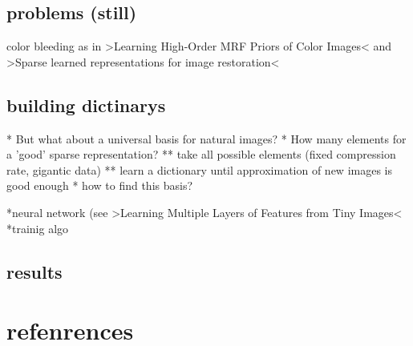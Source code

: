 \subsection{problems (still)}
\begin{frame}
color bleeding as in >Learning High-Order MRF Priors of Color Images< and >Sparse learned representations for image restoration<
\end{frame}

\subsection{building dictinarys}
\begin{frame}
* But what about a universal basis for natural images? 
* How many elements for a 'good' sparse representation?
** take all possible elements (fixed compression rate, gigantic data)
** learn a dictionary until approximation of new images is good enough
* how to find this basis?
\end{frame}

\begin{frame}
*neural network (see >Learning Multiple Layers of Features from Tiny Images<
*trainig algo
\end{frame}

\subsection{results}
\begin{frame}
\end{frame}

\section{refenrences}
\begin{frame}


\nocite{}


\end{frame}

